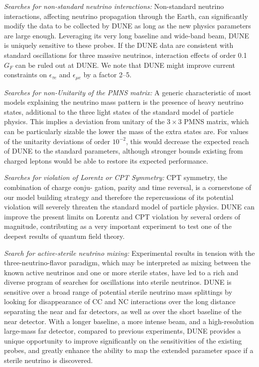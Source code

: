 {\it Searches for non-standard neutrino interactions:} Non-standard neutrino interactions, affecting neutrino propagation through the Earth, can significantly modify the data to be collected by DUNE as long as the new physics parameters are large enough. Leveraging its very long baseline and wide-band beam, DUNE is uniquely sensitive to these probes. If the DUNE data are consistent with standard oscillations for three massive neutrinos, interaction effects of order 0.1 $G_{F}$ can be ruled out at DUNE. We note that DUNE might improve current constraints on $\epsilon_{\tau e}$ and $\epsilon_{\mu e}$ by a factor 2--5.

{\it Searches for non-Unitarity of the PMNS matrix:} A generic characteristic of most models explaining the neutrino mass pattern is the presence of heavy neutrino states, additional to the three light states of the standard model of particle physics. This implies a deviation from unitary of the $3 \times 3$ PMNS matrix, which can be particularly sizable the lower the mass of the extra states are.  For values of the unitarity deviations of order $10^{-2}$, this would decrease the expected reach of DUNE to the standard parameters, although stronger bounds existing from charged leptons would be able to restore its expected performance.

{\it Searches for violation of Lorentz or CPT Symmetry:} CPT symmetry, the combination of charge conju- gation, parity and time reversal, is a cornerstone of our model building strategy and therefore the repercussions of its potential violation will severely threaten the standard model of particle physics. DUNE can improve the present limits on Lorentz and CPT violation by several orders of magnitude, contributing as a very important experiment to test one of the deepest results of quantum field theory.

{\it Search for active-sterile neutrino mixing:} Experimental results in tension with the three-neutrino-flavor paradigm, which may be interpreted as mixing between the known active neutrinos and one or more sterile states, have led to a rich and diverse program of searches for oscillations into sterile neutrinos. DUNE is sensitive over a broad range of potential sterile neutrino mass splittings by looking for disappearance of CC and NC interactions over the long distance separating the near and far detectors, as well as over the short baseline of the near detector. With a longer baseline, a more intense beam, and a high-resolution large-mass far detector, compared to previous experiments, DUNE provides a unique opportunity to improve significantly on the sensitivities of the existing probes, and greatly enhance the ability to map the extended parameter space if a sterile neutrino is discovered.


